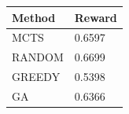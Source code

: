 \begin{tabular}{ll}
\hline
Method & Reward \\
\hline
  MCTS & 0.6597 \\
  RANDOM & 0.6699 \\
  GREEDY & 0.5398 \\
  GA & 0.6366 \\
\hline
\end{tabular}

